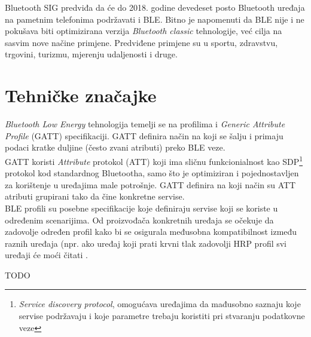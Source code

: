Bluetooth SIG predviđa da će do 2018. godine devedeset posto Bluetooth uređaja na pametnim telefonima podržavati i BLE. 
Bitno je napomenuti da BLE nije i ne pokušava biti optimizirana verzija \textit{Bluetooth classic} tehnologije, već cilja na sasvim nove načine primjene. 
Predviđene primjene su u sportu, zdravstvu, trgovini, turizmu, mjerenju udaljenosti i druge.


\section*{Tehničke značajke}

\textit{Bluetooth Low Energy} tehnologija temelji se na profilima i \textit{Generic Attribute Profile} (GATT) specifikaciji. 
GATT definira način na koji se šalju i primaju podaci kratke duljine (često zvani atributi) preko BLE veze.
\\
GATT koristi \textit{Attribute} protokol (ATT) koji ima sličnu funkcionialnost kao SDP\footnote{\textit{Service discovery protocol}, omogućava uređajima da mađusobno saznaju koje servise podržavaju i koje parametre trebaju koristiti pri stvaranju podatkovne veze} protokol kod standardnog Bluetootha, samo što je optimiziran i pojednostavljen za korištenje u uređajima male potrošnje. 
GATT definira na koji način su ATT atributi grupirani tako da čine konkretne servise.
\\

BLE profili su posebne specifikacije koje definiraju servise koji se koriste u određenim scenarijima. 
Od proizvođača konkretnih uređaja se očekuje da zadovolje određen profil kako bi se osigurala međusobna kompatibilnost između raznih uređaja (npr. ako uređaj koji prati krvni tlak zadovolji HRP profil svi uređaji će moći čitati  . 





TODO